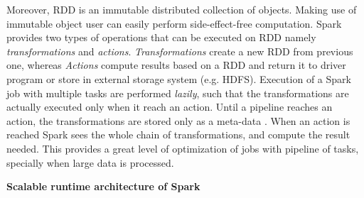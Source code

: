Moreover, RDD is an immutable distributed collection of objects. Making use of immutable object user can easily perform side-effect-free computation. Spark provides two types of operations that can be executed on RDD namely \textit{transformations} and \textit{actions}. \textit{Transformations} create a new RDD from previous one, whereas \textit{Actions} compute results based on a RDD and return it to driver program or store in external storage system (e.g. HDFS). Execution of a Spark job with multiple tasks are performed \textit{lazily}, such that the transformations are actually executed only when it reach an action. Until a pipeline reaches an action, the transformations are stored only as a meta-data \cite{learnspark}. When an action is reached Spark sees the whole chain of transformations, and compute the result needed. This provides a great level of optimization of jobs with pipeline of tasks, specially when large data is processed. 

\textbf{Scalable runtime architecture of Spark}

